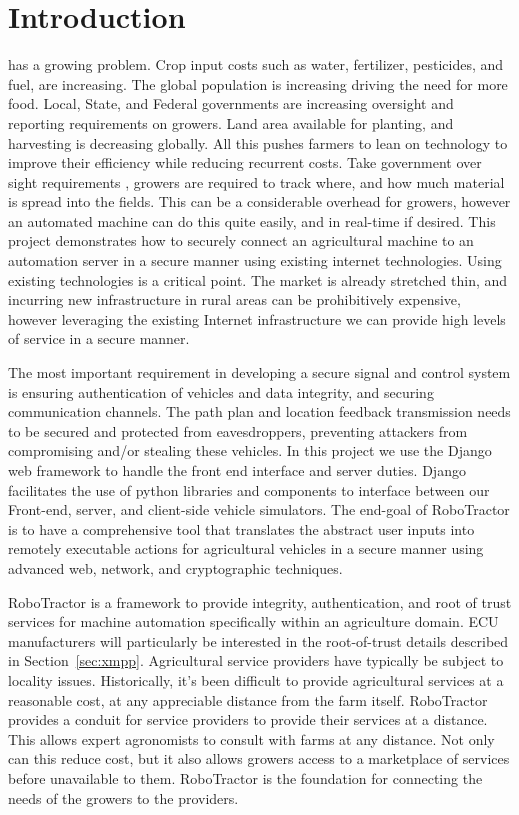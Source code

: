 \documentclass[conference,12pt]{IEEEtran}
\begin{document}
\section{Introduction}
 has a growing problem. Crop input costs such as water,
fertilizer, pesticides, and fuel, are increasing. The global population is
increasing driving the need for more food. Local, State, and Federal governments
are increasing oversight and reporting requirements on growers. Land area
available for planting, and harvesting is decreasing globally. All this pushes
farmers to lean on technology to improve their efficiency while reducing
recurrent costs. Take government over sight requirements
\autocite{_growers_oversight}, growers are required to track where, and how much
material is spread into the fields.  This can be a considerable overhead for
growers, however an automated machine can do this quite easily, and in real-time
if  desired.  This project demonstrates how to securely connect an agricultural
machine to an automation server in a secure manner using existing internet
technologies. Using existing technologies is a critical point. The market is
already stretched thin, and incurring new infrastructure in rural areas can be
prohibitively expensive, however leveraging the existing Internet infrastructure we
can provide high levels of service in a secure manner.

The most important requirement in developing a secure signal and control
system is ensuring authentication of vehicles and data integrity, and securing communication channels.
The path plan and location feedback transmission needs to be secured
and protected from eavesdroppers, preventing attackers from
compromising and/or stealing these vehicles. In this project we use
the Django web framework to handle the front end interface and server duties. 
Django facilitates the use of python libraries and components to interface between our Front-end, server, and client-side vehicle simulators.
The end-goal of RoboTractor is to have a comprehensive tool that
translates the abstract user inputs into remotely executable actions for
agricultural vehicles in a secure manner using advanced web, network, and cryptographic techniques.

RoboTractor is a framework to provide integrity, authentication, and root of
trust services for machine automation specifically within an agriculture domain.
ECU manufacturers will particularly be interested in the root-of-trust details
described in Section~\ref{sec:xmpp}.  Agricultural service providers have
typically be subject to locality issues. Historically, it's been difficult to
provide agricultural services at a reasonable cost, at any appreciable distance
from the farm itself.  RoboTractor provides a conduit for service providers to
provide their services at a distance. This allows expert agronomists to consult
with farms at any distance.  Not only can this reduce cost, but it also allows
growers access to a marketplace of services before unavailable to them.
RoboTractor is the foundation for connecting the needs of the growers to the
providers.  
\end{document}
